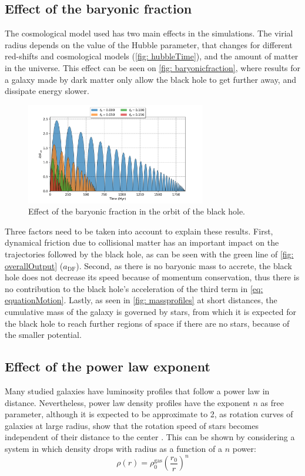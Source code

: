 	\subsection{Effect of the baryonic fraction}
	The cosmological model used has two main effects in the simulations. The virial radius depends on the value of the Hubble parameter, that changes for different red-shifts and cosmological models (\autoref{fig: hubbleTime}), and the amount of matter in the universe. This effect can be seen on \autoref{fig: baryonicfraction}, where results for a galaxy made by dark matter only allow the black hole to get further away, and dissipate energy slower.
	\begin{figure}[h]
		\centering
		\includegraphics[width = 0.7\textwidth]{"../Files/Week 5/baryonic_fraction_comparison"}
		\caption{Effect of the baryonic fraction in the orbit of the black hole.}
		\label{fig: baryonicfraction}
	\end{figure}

	Three factors need to be taken into account to explain these results. First, dynamical friction due to collisional matter has an important impact on the trajectories followed by the black hole, as can be seen with the green line of \autoref{fig: overallOutput} ($a_\text{DF}$). Second, as there is no baryonic mass to accrete, the black hole does not decrease its speed because of momentum conservation, thus there is no contribution to the black hole's acceleration of the third term in \autoref{eq: equationMotion}. Lastly, as seen in \autoref{fig: massprofiles} at short distances, the cumulative mass of the galaxy is governed by stars, from which it is expected for the black hole to reach further regions of space if there are no stars, because of the smaller potential.
		
	\subsection{Effect of the power law exponent}	
		Many studied galaxies have luminosity profiles that follow a power law in distance. Nevertheless, power law density profiles have the exponent $n$ as free parameter, although it is expected to be approximate to 2, as rotation curves of galaxies at large radius, show that the rotation speed of stars becomes independent of their distance to the center \cite{binney2011galactic}. This can be shown by considering a system in which density drops with radius as a function of a $n$ power:
		\begin{equation}
			\rho(r) = \rho_0^\text{gas}\left(\dfrac{r_0}{r}\right)^n
		\end{equation}
		

